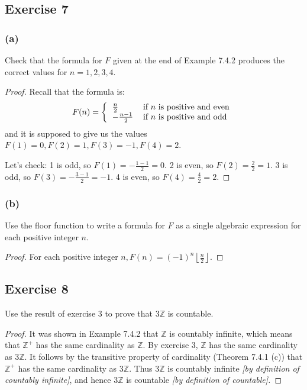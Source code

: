\documentclass[14pt]{extarticle}
\newcommand{\dps}{\displaystyle}
\newcommand{\Z}{\mathbb{Z}}
\newcommand{\floor}[1]{{\left\lfloor#1\right\rfloor}}
\begin{document}
\subsection{Exercise 7}
\subsubsection{(a)}
Check that the formula for $F$ given at the end of Example 7.4.2 produces the correct values for \(n = 1, 2, 3, 4\).

\begin{proof}
Recall that the formula is:
\[
F(n) =
\left\{
\begin{tabular}{ll}
\(\frac{n}{2}\) & if $n$ is positive and even \\
\(-\frac{n-1}{2}\) & if $n$ is positive and odd
\end{tabular}
\right.
\]
and it is supposed to give us the values \(F(1) = 0, F(2) = 1, F(3) = -1, F(4) = 2\).

Let's check: 1 is odd, so \(F(1) = -\frac{1-1}{2} = 0\). 2 is even, so \(F(2) = \frac{2}{2} = 1\). 3 is odd, so
\(F(3) = -\frac{3-1}{2} = -1\). 4 is even, so \(F(4) = \frac{4}{2} = 2\).
\end{proof}

\subsubsection{(b)}
Use the floor function to write a formula for $F$ as a single algebraic expression for each positive integer $n$.

\begin{proof}
For each positive integer \(\dps n, F(n) = (-1)^n \floor{ \frac{n}{2}}\).
\end{proof}

\subsection{Exercise 8}
Use the result of exercise 3 to prove that $3\Z$ is countable.

\begin{proof}
It was shown in Example 7.4.2 that $\Z$ is countably infinite, which means that $\Z^+$ has the same cardinality 
as $\Z$. By exercise 3, $\Z$ has the same cardinality as $3\Z$. It follows by the transitive property of cardinality 
(Theorem 7.4.1 (c)) that $\Z^+$ has the same cardinality as $3\Z$. Thus $3\Z$ is countably infinite {\it [by definition 
of countably infinite]}, and hence $3\Z$ is countable {\it [by definition of countable].}
\end{proof}
\end{document}
